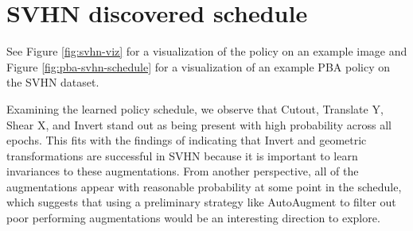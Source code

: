 \documentclass{article}
\begin{document}
\section{SVHN discovered schedule}
See Figure \ref{fig:svhn-viz} for a visualization of the policy on an example image and Figure \ref{fig:pba-svhn-schedule} for a visualization of an example PBA policy on the SVHN dataset.

Examining the learned policy schedule, we observe that Cutout, Translate Y, Shear X, and Invert stand out as being present with high probability across all epochs. This fits with the findings of \cite{autoaug} indicating that Invert and geometric transformations are successful in SVHN because it is important to learn invariances to these augmentations. From another perspective, all of the augmentations appear with reasonable probability at some point in the schedule, which suggests that using a preliminary strategy like AutoAugment to filter out poor performing augmentations would be an interesting direction to explore.
\end{document}
